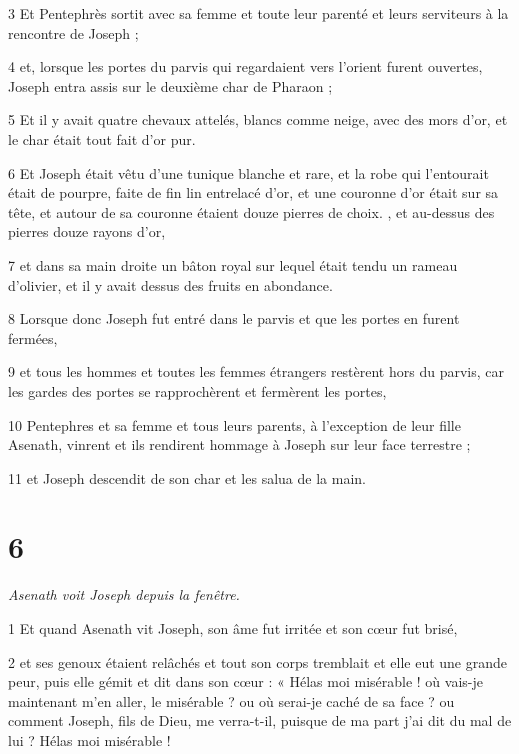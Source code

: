 \par 3 Et Pentephrès sortit avec sa femme et toute leur parenté et leurs serviteurs à la rencontre de Joseph ;

\par 4 et, lorsque les portes du parvis qui regardaient vers l'orient furent ouvertes, Joseph entra assis sur le deuxième char de Pharaon ;

\par 5 Et il y avait quatre chevaux attelés, blancs comme neige, avec des mors d'or, et le char était tout fait d'or pur.

\par 6 Et Joseph était vêtu d'une tunique blanche et rare, et la robe qui l'entourait était de pourpre, faite de fin lin entrelacé d'or, et une couronne d'or était sur sa tête, et autour de sa couronne étaient douze pierres de choix. , et au-dessus des pierres douze rayons d'or,

\par 7 et dans sa main droite un bâton royal sur lequel était tendu un rameau d'olivier, et il y avait dessus des fruits en abondance.

\par 8 Lorsque donc Joseph fut entré dans le parvis et que les portes en furent fermées,

\par 9 et tous les hommes et toutes les femmes étrangers restèrent hors du parvis, car les gardes des portes se rapprochèrent et fermèrent les portes,

\par 10 Pentephres et sa femme et tous leurs parents, à l'exception de leur fille Asenath, vinrent et ils rendirent hommage à Joseph sur leur face terrestre ;

\par 11 et Joseph descendit de son char et les salua de la main.

\chapter{6}

\textit{Asenath voit Joseph depuis la fenêtre.}

\par 1 Et quand Asenath vit Joseph, son âme fut irritée et son cœur fut brisé,

\par 2 et ses genoux étaient relâchés et tout son corps tremblait et elle eut une grande peur, puis elle gémit et dit dans son cœur : « Hélas moi misérable ! où vais-je maintenant m'en aller, le misérable ? ou où serai-je caché de sa face ? ou comment Joseph, fils de Dieu, me verra-t-il, puisque de ma part j'ai dit du mal de lui ? Hélas moi misérable !

